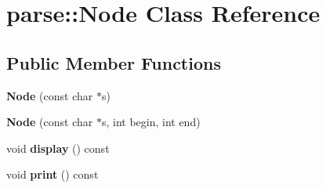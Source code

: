 \hypertarget{classparse_1_1_node}{
\section{parse::Node Class Reference}
\label{classparse_1_1_node}
}
\subsection*{Public Member Functions}
\begin{DoxyCompactItemize}
\item 
\hypertarget{classparse_1_1_node_a526b89693b5a6be5debdee9baa346851}{
{\bfseries Node} (const char $\ast$s)}
\label{classparse_1_1_node_a526b89693b5a6be5debdee9baa346851}

\item 
\hypertarget{classparse_1_1_node_a1f16e15ad1eb54eeafe435bc248c9d20}{
{\bfseries Node} (const char $\ast$s, int begin, int end)}
\label{classparse_1_1_node_a1f16e15ad1eb54eeafe435bc248c9d20}

\item 
\hypertarget{classparse_1_1_node_afbf3e1110cda6b2dd7ccc5c0fd3067ea}{
void {\bfseries display} () const }
\label{classparse_1_1_node_afbf3e1110cda6b2dd7ccc5c0fd3067ea}

\item 
\hypertarget{classparse_1_1_node_a391e7163709229848ca02ba5316cf0aa}{
void {\bfseries print} () const }
\label{classparse_1_1_node_a391e7163709229848ca02ba5316cf0aa}

\end{DoxyCompactItemize}
